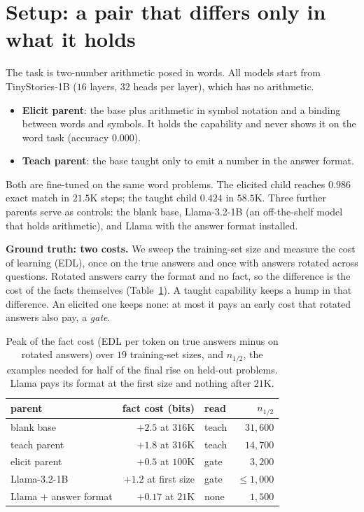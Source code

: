 \documentclass{article}
\theoremstyle{definition}
\begin{document}
\section{Setup: a pair that differs only in what it holds}
\label{sec:setup}

The task is two-number arithmetic posed in words. All models start from TinyStories-1B ($16$ layers, $32$ heads
per layer), which has no arithmetic.
\begin{itemize}[leftmargin=*,nosep]
\item \textbf{Elicit parent}: the base plus arithmetic in symbol notation and a binding between words and symbols.
  It holds the capability and never shows it on the word task (accuracy $0.000$).
\item \textbf{Teach parent}: the base taught only to emit a number in the answer format.
\end{itemize}
Both are fine-tuned on the same word problems. The elicited child reaches $0.986$ exact match in $21.5$K steps;
the taught child $0.424$ in $58.5$K. Three further parents serve as controls: the blank base, Llama-3.2-1B (an
off-the-shelf model that holds arithmetic), and Llama with the answer format installed.

\textbf{Ground truth: two costs.} We sweep the training-set size and measure the cost of learning (EDL), once on
the true answers and once with answers rotated across questions. Rotated answers carry the format and no fact, so
the difference is the cost of the facts themselves (Table~\ref{tab:costs}). A taught capability keeps a hump in
that difference. An elicited one keeps none: at most it pays an early cost that rotated answers also pay, a
\emph{gate}.

\begin{table}[t]
\centering
\small
\setlength{\tabcolsep}{3.5pt}
\begin{tabular}{lrlr}
\toprule
parent & fact cost (bits) & read & $n_{1/2}$ \\
\midrule
blank base & $+2.5$ at $316$K & teach & $31{,}600$ \\
teach parent & $+1.8$ at $316$K & teach & $14{,}700$ \\
elicit parent & $+0.5$ at $100$K & gate & $3{,}200$ \\
Llama-3.2-1B & $+1.2$ at first size & gate & $\le1{,}000$ \\
Llama + answer format & $+0.17$ at $21$K & none & $1{,}500$ \\
\bottomrule
\end{tabular}
\caption{Peak of the fact cost (EDL per token on true answers minus on rotated answers) over $19$ training-set
sizes, and $n_{1/2}$, the examples needed for half of the final rise on held-out problems. Llama pays its
format at the first size and nothing after $21$K.}
\label{tab:costs}
\end{table}
\end{document}
